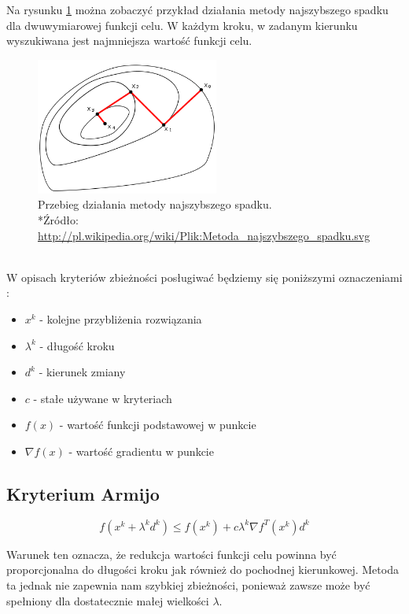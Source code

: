 \documentclass{classrep}
\begin{document}
Na rysunku \ref{fig:metodaNS_przebieg} można zobaczyć przykład działania metody najszybszego spadku dla dwuwymiarowej funkcji celu. W każdym kroku, w zadanym kierunku wyszukiwana jest najmniejsza wartość funkcji celu.
\begin{figure}[h!]
\centering
\includegraphics[width=6cm]{obrazy/metodaNS_przebieg} 
\caption{Przebieg działania metody najszybszego spadku. \\*{\footnotesize Źródło: \url{http://pl.wikipedia.org/wiki/Plik:Metoda_najszybszego_spadku.svg}}}
\label{fig:metodaNS_przebieg}
\end{figure}
\\
W opisach kryteriów zbieżności posługiwać będziemy się poniższymi oznaczeniami :
\begin{itemize}
 \item $x^k$ - kolejne przybliżenia rozwiązania
 \item $\lambda ^k$ - długość kroku
 \item $d ^k$ - kierunek zmiany
 \item $c$ - stałe używane w kryteriach
 \item $f(x)$ - wartość funkcji podstawowej w punkcie
 \item $\nabla f(x)$ - wartość gradientu w punkcie
\end{itemize}
\subsection{Kryterium Armijo}

\begin{equation}
f( x^{k} + \lambda ^{k} d^{k} ) \leq f(x^{k}) + c \lambda ^{k} \nabla f^{T} (x ^{k} ) d^{k}
\end{equation}

Warunek ten oznacza, że redukcja wartości funkcji celu powinna być proporcjonalna do długości kroku jak również do pochodnej kierunkowej. Metoda ta jednak nie zapewnia nam szybkiej zbieżności, ponieważ zawsze może być spełniony dla dostatecznie małej wielkości $\lambda$.
\end{document}
